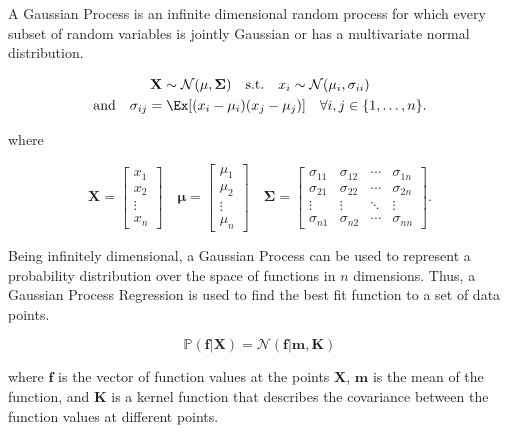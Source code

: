 A Gaussian Process is an infinite dimensional random process for which every subset of random variables is jointly Gaussian or has a multivariate normal distribution.

\begin{equation}
  \begin{gathered}
    \mathbf{X} \sim \mathcal{N}(\mathbf{\mu}, \mathbf{\Sigma}) \quad \text{s.t.} \quad x_i \sim \mathcal{N}(\mu_i, \sigma_{ii}) \\
    \text{and} \quad  \sigma_{ij} = \Ex[(x_i - \mu_i)(x_j - \mu_j)] \quad \forall i,j \in \{1, \ldots, n\}.
  \end{gathered}
\end{equation}


where

\begin{equation}
  \mathbf{X} = \begin{bmatrix}
    x_1    \\
    x_2    \\
    \vdots \\
    x_n
  \end{bmatrix}
  \quad
  \mathbf{\mu} = \begin{bmatrix}
    \mu_1  \\
    \mu_2  \\
    \vdots \\
    \mu_n
  \end{bmatrix}
  \quad
  \mathbf{\Sigma} = \begin{bmatrix}
    \sigma_{11} & \sigma_{12} & \cdots & \sigma_{1n} \\
    \sigma_{21} & \sigma_{22} & \cdots & \sigma_{2n} \\
    \vdots      & \vdots      & \ddots & \vdots      \\
    \sigma_{n1} & \sigma_{n2} & \cdots & \sigma_{nn}
  \end{bmatrix}.
\end{equation}

Being infinitely dimensional, a Gaussian Process can be used to represent a probability distribution over the space of functions in $n$ dimensions. Thus, a Gaussian Process Regression is used to find the best fit function to a set of data points.

\begin{equation}
  \mathbb{P}(\mathbf{f} | \mathbf{X}) = \mathcal{N}(\mathbf{f} | \mathbf{m}, \mathbf{K})
\end{equation}

where $\mathbf{f}$ is the vector of function values at the points $\mathbf{X}$, $\mathbf{m}$ is the mean of the function, and $\mathbf{K}$ is a kernel function that describes the covariance between the function values at different points.

